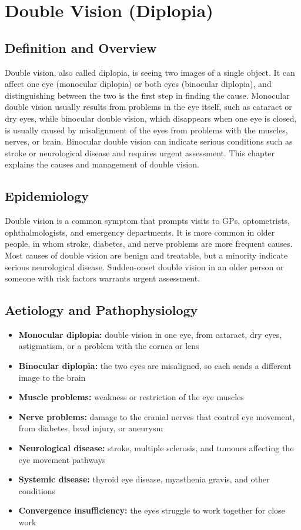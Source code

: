 \chapter{Double Vision (Diplopia)}

\section*{Definition and Overview}
Double vision, also called diplopia, is seeing two images of a single object. It can affect one eye (monocular diplopia) or both eyes (binocular diplopia), and distinguishing between the two is the first step in finding the cause. Monocular double vision usually results from problems in the eye itself, such as cataract or dry eyes, while binocular double vision, which disappears when one eye is closed, is usually caused by misalignment of the eyes from problems with the muscles, nerves, or brain. Binocular double vision can indicate serious conditions such as stroke or neurological disease and requires urgent assessment. This chapter explains the causes and management of double vision.

\section*{Epidemiology}
Double vision is a common symptom that prompts visits to GPs, optometrists, ophthalmologists, and emergency departments. It is more common in older people, in whom stroke, diabetes, and nerve problems are more frequent causes. Most causes of double vision are benign and treatable, but a minority indicate serious neurological disease. Sudden-onset double vision in an older person or someone with risk factors warrants urgent assessment.

\section*{Aetiology and Pathophysiology}
\begin{itemize}
    \item \textbf{Monocular diplopia:} double vision in one eye, from cataract, dry eyes, astigmatism, or a problem with the cornea or lens
    \item \textbf{Binocular diplopia:} the two eyes are misaligned, so each sends a different image to the brain
    \item \textbf{Muscle problems:} weakness or restriction of the eye muscles
    \item \textbf{Nerve problems:} damage to the cranial nerves that control eye movement, from diabetes, head injury, or aneurysm
    \item \textbf{Neurological disease:} stroke, multiple sclerosis, and tumours affecting the eye movement pathways
    \item \textbf{Systemic disease:} thyroid eye disease, myasthenia gravis, and other conditions
    \item \textbf{Convergence insufficiency:} the eyes struggle to work together for close work
\end{itemize}

